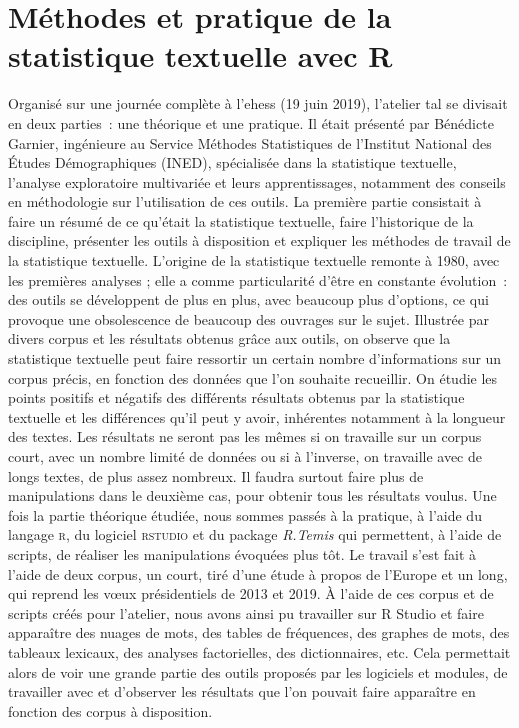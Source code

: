 \section{Méthodes et pratique de la statistique textuelle avec R}
Organisé sur une journée complète à l'\acrshort{ehess} (19 juin 2019), l'atelier \acrshort{tal} se divisait en deux parties~: une théorique et une pratique. Il était présenté par Bénédicte Garnier, ingénieure au Service Méthodes Statistiques de l'Institut National des Études Démographiques (INED), spécialisée dans la statistique textuelle,  l'analyse exploratoire multivariée et leurs apprentissages, notamment des conseils en méthodologie sur l'utilisation de ces outils. 
La première partie consistait à faire un résumé de ce qu'était la statistique textuelle, faire l'historique de la discipline, présenter les outils à disposition et expliquer les méthodes de travail de la statistique textuelle. L'origine de la statistique textuelle remonte à 1980, avec les premières analyses ; elle a comme particularité d'être en constante évolution~: des outils se développent de plus en plus, avec beaucoup plus d'options, ce qui provoque une obsolescence de beaucoup des ouvrages sur le sujet. Illustrée par divers corpus et les résultats obtenus grâce aux outils, on observe que la statistique textuelle peut faire ressortir un certain nombre d'informations sur un corpus précis, en fonction des données que l'on souhaite recueillir. On étudie les points positifs et négatifs des différents résultats obtenus par la statistique textuelle et les différences qu'il peut y avoir, inhérentes notamment à la longueur des textes. Les résultats ne seront pas les mêmes si on travaille sur un corpus court, avec un nombre limité de données ou si à l'inverse, on travaille avec de longs textes, de plus assez nombreux. Il faudra surtout faire plus de manipulations dans le deuxième cas, pour obtenir tous les résultats voulus. 
Une fois la partie théorique étudiée, nous sommes passés à la pratique, à l'aide du langage \textsc{r}, du logiciel \textsc{rstudio} et du package \emph{R.Temis} qui permettent, à l'aide de scripts, de réaliser les manipulations évoquées plus tôt. Le travail s'est fait à l'aide de deux corpus, un court, tiré d'une étude à propos de l'Europe et un long, qui reprend les vœux présidentiels de 2013 et 2019. À l'aide de ces corpus et de scripts créés pour l'atelier, nous avons ainsi pu travailler sur R Studio et faire apparaître des nuages de mots, des tables de fréquences, des graphes de mots, des tableaux lexicaux, des analyses factorielles, des dictionnaires, etc. Cela permettait alors de voir une grande partie des outils proposés par les logiciels et modules, de travailler avec et d'observer les résultats que l'on pouvait faire apparaître en fonction des corpus à disposition.